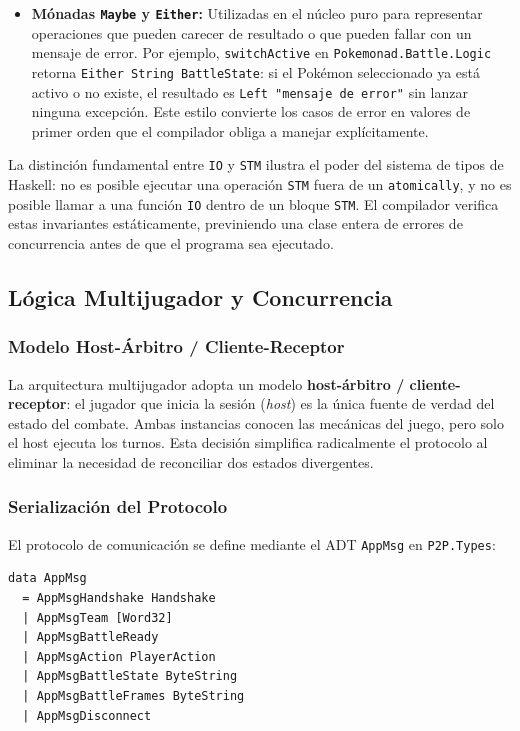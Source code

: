 \begin{itemize}
    \item \textbf{Mónadas \texttt{Maybe} y \texttt{Either}:} Utilizadas en el núcleo puro para representar operaciones que pueden carecer de resultado o que pueden fallar con un mensaje de error. Por ejemplo, \texttt{switchActive} en \texttt{Pokemonad.Battle.Logic} retorna \texttt{Either String BattleState}: si el Pokémon seleccionado ya está activo o no existe, el resultado es \texttt{Left "mensaje de error"} sin lanzar ninguna excepción. Este estilo convierte los casos de error en valores de primer orden que el compilador obliga a manejar explícitamente.
\end{itemize}

La distinción fundamental entre \texttt{IO} y \texttt{STM} ilustra el poder del sistema de tipos de Haskell: no es posible ejecutar una operación \texttt{STM} fuera de un \texttt{atomically}, y no es posible llamar a una función \texttt{IO} dentro de un bloque \texttt{STM}. El compilador verifica estas invariantes estáticamente, previniendo una clase entera de errores de concurrencia antes de que el programa sea ejecutado.

\subsection{Lógica Multijugador y Concurrencia}

\subsubsection*{Modelo Host-Árbitro / Cliente-Receptor}

La arquitectura multijugador adopta un modelo \textbf{host-árbitro / cliente-receptor}: el jugador que inicia la sesión (\textit{host}) es la única fuente de verdad del estado del combate. Ambas instancias conocen las mecánicas del juego, pero solo el host ejecuta los turnos. Esta decisión simplifica radicalmente el protocolo al eliminar la necesidad de reconciliar dos estados divergentes.

\subsubsection*{Serialización del Protocolo}

El protocolo de comunicación se define mediante el ADT \texttt{AppMsg} en \texttt{P2P.Types}:

\begin{verbatim}
data AppMsg
  = AppMsgHandshake Handshake
  | AppMsgTeam [Word32]
  | AppMsgBattleReady
  | AppMsgAction PlayerAction
  | AppMsgBattleState ByteString
  | AppMsgBattleFrames ByteString
  | AppMsgDisconnect
\end{verbatim}

